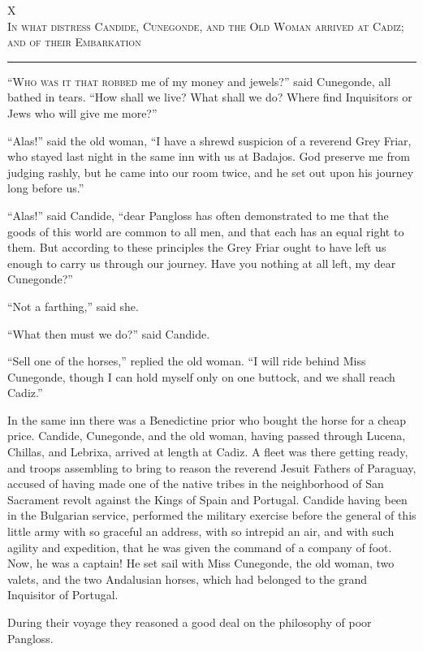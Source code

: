 \begin{center}
X\\
\textsc{In what distress Candide, Cunegonde, and the Old Woman arrived at Cadiz; and of their Embarkation}
\end{center}
\vspace{-0.5cm}
\rule{\textwidth}{0.5pt}
\lettrine{``W}{ho was it that robbed} me of my money and jewels?'' said Cunegonde, all bathed in tears. ``How shall we live? What shall we do? Where find Inquisitors or Jews who will give me more?''

``Alas!'' said the old woman, ``I have a shrewd suspicion of a reverend Grey Friar, who stayed last night in the same inn with us at Badajos. God preserve me from judging rashly, but he came into our room twice, and he set out upon his journey long before us.''

``Alas!'' said Candide, ``dear Pangloss has often demonstrated to me that the goods of this world are common to all men, and that each has an equal right to them. But according to these principles the Grey Friar ought to have left us enough to carry us through our journey. Have you nothing at all left, my dear Cunegonde?''

``Not a farthing,'' said she.

``What then must we do?'' said Candide.

``Sell one of the horses,'' replied the old woman. ``I will ride behind Miss Cunegonde, though I can hold myself only on one buttock, and we shall reach Cadiz.''

In the same inn there was a Benedictine prior who bought the horse for a cheap price. Candide, Cunegonde, and the old woman, having passed through Lucena, Chillas, and Lebrixa, arrived at length at Cadiz. A fleet was there getting ready, and troops assembling to bring to reason the reverend Jesuit Fathers of Paraguay, accused of having made one of the native tribes in the neighborhood of San Sacrament revolt against the Kings of Spain and Portugal. Candide having been in the Bulgarian service, performed the military exercise before the general of this little army with so graceful an address, with so intrepid an air, and with such agility and expedition, that he was given the command of a company of foot. Now, he was a captain! He set sail with Miss Cunegonde, the old woman, two valets, and the two Andalusian horses, which had belonged to the grand Inquisitor of Portugal.

During their voyage they reasoned a good deal on the philosophy of poor Pangloss.

